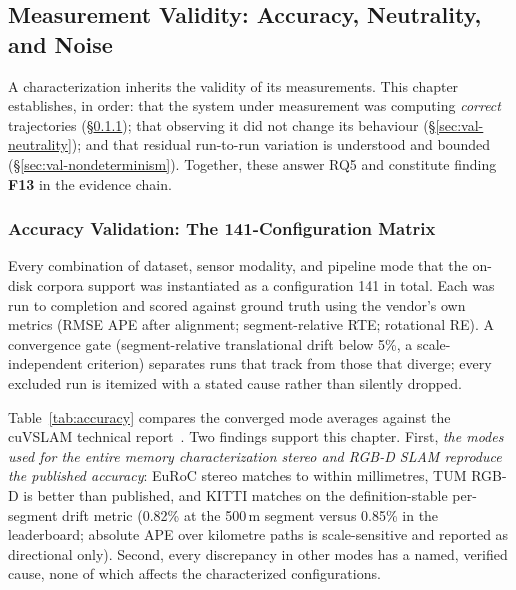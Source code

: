 \subsection{Measurement Validity: Accuracy, Neutrality, and Noise}
\label{ch:validity}

A characterization inherits the validity of its measurements. This chapter establishes, in order: that the system under measurement was computing \emph{correct} trajectories (\S\ref{sec:val-accuracy}); that observing it did not change its behaviour (\S\ref{sec:val-neutrality}); and that residual run-to-run variation is understood and bounded (\S\ref{sec:val-nondeterminism}). Together, these answer RQ5 and constitute finding \textbf{F13} in the evidence chain.

\subsubsection{Accuracy Validation: The 141-Configuration Matrix}
\label{sec:val-accuracy}

Every combination of dataset, sensor modality, and pipeline mode that the on-disk corpora support was instantiated as a configuration 141 in total. Each was run to completion and scored against ground truth using the vendor's own metrics (RMSE APE after alignment; segment-relative RTE; rotational RE). A convergence gate (segment-relative translational drift below 5\%, a scale-independent criterion) separates runs that track from those that diverge; every excluded run is itemized with a stated cause rather than silently dropped.

Table~\ref{tab:accuracy} compares the converged mode averages against the cuVSLAM technical report~\cite{cuvslam2025}. Two findings support this chapter. First, \emph{the modes used for the entire memory characterization stereo and RGB-D SLAM reproduce the published accuracy}: EuRoC stereo matches to within millimetres, TUM RGB-D is better than published, and KITTI matches on the definition-stable per-segment drift metric (0.82\% at the 500\,m segment versus 0.85\% in the leaderboard; absolute APE over kilometre paths is scale-sensitive and reported as directional only). Second, every discrepancy in other modes has a named, verified cause, none of which affects the characterized configurations.

